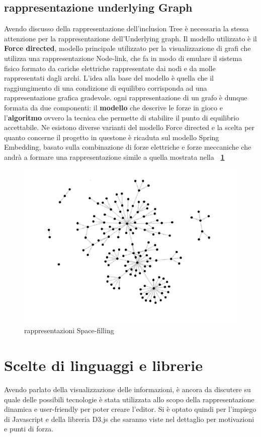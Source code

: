 {\subsection{rappresentazione underlying Graph}
Avendo discusso della rappresentazione dell'inclusion Tree è necessaria la stessa attenzione per la rappresentazione dell'Underlying graph. Il modello utilizzato è il \textbf{Force directed}, modello principale utilizzato per la visualizzazione di grafi che utilizza una rappresentazione Node-link, che fa in modo di emulare il sistema fisico formato da cariche elettriche rappresentate dai nodi e da molle rappresentati dagli archi. L'idea alla base del modello è quella che il raggiungimento di una condizione di equilibro corrisponda ad una rappresentazione grafica gradevole. ogni rappresentazione di un grafo è dunque formata da due componenti: il \textbf{modello} che descrive le forze in gioco e l'\textbf{algoritmo} ovvero la tecnica che permette di stabilire il punto di equilibrio accettabile. Ne esistono diverse varianti del modello Force directed e la scelta per quanto concerne il progetto in questone è ricaduta sul modello Spring Embedding, basato sulla combinazione di forze elettriche e forze meccaniche che andrà a formare una rappresentazione simile a quella mostrata nella \textbf{\figurename~\ref{fig:spring}}   
\begin{figure}[!htb]
	\begin{center}
		\includegraphics[width=0.8 \linewidth]{figure/spring}
	\end{center}
	\caption{rappresentazioni Space-filling\label{fig:spring}}
\end{figure}
\section{Scelte di linguaggi e librerie}
Avendo parlato della visualizzazione delle informazioni, è ancora da discutere su quale delle possibili tecnologie è stata utilizzata allo scopo della rappresentazione dinamica e user-friendly per poter creare l'editor.
Si è optato quindi per l'impiego di Javascript e della libreria D3.js che saranno viste nel dettaglio per motivazioni e punti di forza.
}
